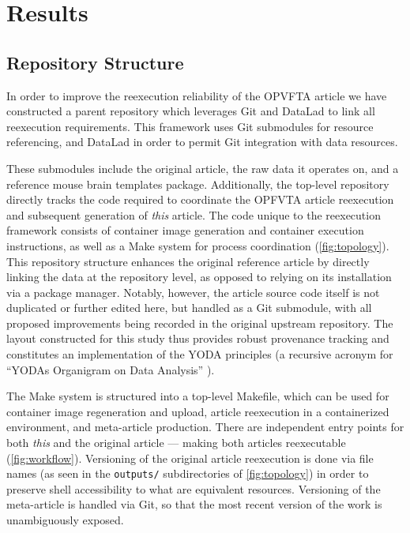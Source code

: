 \section{Results}


\subsection{Repository Structure}

In order to improve the reexecution reliability of the OPVFTA article we have constructed a parent repository which leverages Git and DataLad to link all reexecution requirements.
This framework uses Git submodules for resource referencing, and DataLad \cite{datalad} in order to permit Git integration with data resources.

These submodules include the original article, the raw data it operates on, and a reference mouse brain templates package.
Additionally, the top-level repository directly tracks the code required to coordinate the OPFVTA article reexecution and subsequent generation of \emph{this} article.
The code unique to the reexecution framework consists of container image generation and container execution instructions, as well as a Make system for process coordination (\cref{fig:topology}).
This repository structure enhances the original reference article by directly linking the data at the repository level, as opposed to relying on its installation via a package manager.
Notably, however, the article source code itself is not duplicated or further edited here, but handled as a Git submodule, with all proposed improvements being recorded in the original upstream repository.
The layout constructed for this study thus provides robust provenance tracking and constitutes an implementation of the YODA principles (a recursive acronym for “YODAs Organigram on Data Analysis” \cite{yoda}).

The Make system is structured into a top-level Makefile, which can be used for container image regeneration and upload, article reexecution in a containerized environment, and meta-article production.
There are independent entry points for both \emph{this} and the original article — making both articles reexecutable (\cref{fig:workflow}).
Versioning of the original article reexecution is done via file names (as seen in the \texttt{outputs/} subdirectories of \cref{fig:topology}) in order to preserve shell accessibility to what are equivalent resources.
Versioning of the meta-article is handled via Git, so that the most recent version of the work is unambiguously exposed.

